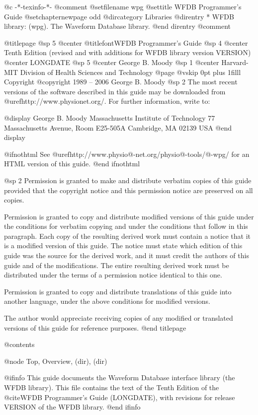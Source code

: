 	@c -*-texinfo-*-
@comment %
@setfilename wpg
@settitle WFDB Programmer's Guide
@setchapternewpage odd
@dircategory Libraries
@direntry
* WFDB library: (wpg).		The Waveform Database library.
@end direntry
@comment %

@titlepage
@sp 5
@center @titlefont{WFDB Programmer's Guide}
@sp 4
@center Tenth Edition (revised and with additions for WFDB library version VERSION)
@center LONGDATE
@sp 5
@center George B. Moody
@sp 1
@center Harvard-MIT Division of Health Sciences and Technology
@page
@vskip 0pt plus 1filll
Copyright @copyright{} 1989 -- 2006 George B. Moody
@sp 2
The most recent versions of the software described in this guide may be
downloaded from @uref{http://www.physionet.org/}.  For further
information, write to:

@display
George B. Moody
Massachusetts Institute of Technology
77 Massachusetts Avenue, Room E25-505A
Cambridge, MA 02139
USA
@end display

@ifnothtml
See @uref{http://www.physio@-net.org/physio@-tools/@-wpg/}
for an HTML version of this guide.
@end ifnothtml

@sp 2
Permission is granted to make and distribute verbatim copies of this
guide provided that the copyright notice and this permission notice are
preserved on all copies.

Permission is granted to copy and distribute modified versions of this
guide under the conditions for verbatim copying and under the conditions
that follow in this paragraph.  Each copy of the resulting derived work
must contain a notice that it is a modified version of this guide.  The
notice must state which edition of this guide was the source for the derived
work, and it must credit the authors of this guide and of the
modifications.  The entire resulting derived work must be distributed
under the terms of a permission notice identical to this one.

Permission is granted to copy and distribute translations of this guide
into another language, under the above conditions for modified versions.

The author would appreciate receiving copies of any modified or
translated versions of this guide for reference purposes.
@end titlepage

@contents

@node Top, Overview, (dir), (dir)

@ifinfo
This guide documents the Waveform Database interface library (the WFDB
library).  This file contains the text of the Tenth Edition of
the @cite{WFDB Programmer's Guide} (LONGDATE), with
revisions for release VERSION of the WFDB library.
@end ifinfo

